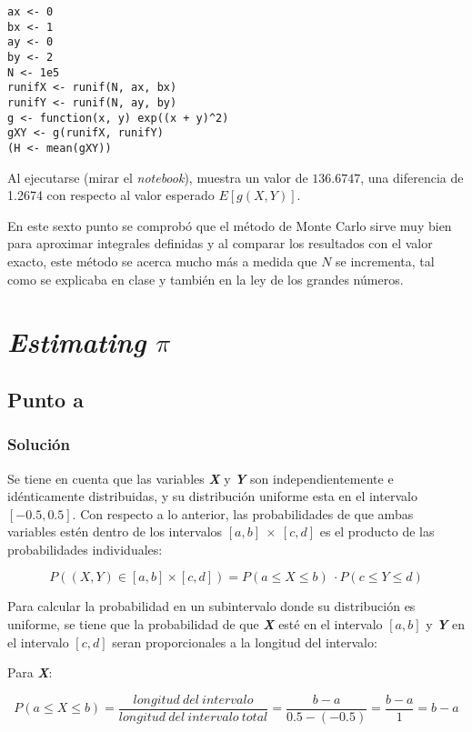 \documentclass[12pt]{article}
\begin{document}
\begin{lstlisting}
ax <- 0
bx <- 1
ay <- 0
by <- 2
N <- 1e5
runifX <- runif(N, ax, bx)
runifY <- runif(N, ay, by)
g <- function(x, y) exp((x + y)^2)
gXY <- g(runifX, runifY)
(H <- mean(gXY))
\end{lstlisting}

Al ejecutarse (mirar el \textit{notebook}), muestra un valor de $136.6747$, una diferencia de 1.2674 con respecto al valor esperado $E[g(X, Y)]$.

En este sexto punto se comprobó que el método de Monte Carlo sirve muy bien para aproximar integrales definidas y al comparar los resultados con el valor exacto, este método se acerca mucho más a medida que $N$ se incrementa, tal como se explicaba en clase y también en la ley de los grandes números.





\section{\textit{Estimating} \(\pi\)}

\subsection{Punto a}
\subsubsection{Solución}

Se tiene en cuenta que las variables \textit{\textbf{X}} y \textit{\textbf{Y}} son independientemente e idénticamente distribuidas, y su distribución uniforme esta en el intervalo $[-0.5, 0.5]$. Con respecto a lo anterior, las probabilidades de que ambas variables estén dentro de los intervalos $[a,b]\ \times\ [c,d]$ es el producto de las probabilidades individuales:


\[P((X,Y) \in [a,b]\times[c,d]) = P(a\leq X \leq b)\ \cdot P(c\leq Y \leq d)\]

Para calcular la probabilidad en un subintervalo donde su distribución es uniforme, se tiene que la probabilidad de que \textit{\textbf{X}} esté en el intervalo $[a,b]$ y \textit{\textbf{Y}} en el intervalo $[c,d]$ seran proporcionales a la longitud del intervalo:

Para \textit{\textbf{X}}:

\[P(a \leq X \leq b) = \frac{longitud\ del\ intervalo}{longitud\ del\ intervalo\  total} = \frac{b-a}{0.5-(-0.5)} = \frac{b-a}{1} = b-a\]
\end{document}
